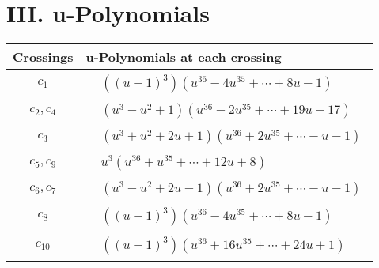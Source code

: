 \documentclass[1p]{elsarticle_modified}
\theoremstyle{definition}
\begin{document}
\newpage\renewcommand{\arraystretch}{1}
\centering \section*{ III. u-Polynomials}
\begin{tabular}{m{50pt}|m{274pt}}
Crossings & \hspace{64pt}u-Polynomials at each crossing \\
\hline $$\begin{aligned}c_{1}\end{aligned}$$&$\begin{aligned}
&((u+1)^3)(u^{36}-4 u^{35}+\cdots+8 u-1)
\end{aligned}$\\
\hline $$\begin{aligned}c_{2},c_{4}\end{aligned}$$&$\begin{aligned}
&(u^3- u^2+1)(u^{36}-2 u^{35}+\cdots+19 u-17)
\end{aligned}$\\
\hline $$\begin{aligned}c_{3}\end{aligned}$$&$\begin{aligned}
&(u^3+u^2+2 u+1)(u^{36}+2 u^{35}+\cdots- u-1)
\end{aligned}$\\
\hline $$\begin{aligned}c_{5},c_{9}\end{aligned}$$&$\begin{aligned}
&u^3(u^{36}+u^{35}+\cdots+12 u+8)
\end{aligned}$\\
\hline $$\begin{aligned}c_{6},c_{7}\end{aligned}$$&$\begin{aligned}
&(u^3- u^2+2 u-1)(u^{36}+2 u^{35}+\cdots- u-1)
\end{aligned}$\\
\hline $$\begin{aligned}c_{8}\end{aligned}$$&$\begin{aligned}
&((u-1)^3)(u^{36}-4 u^{35}+\cdots+8 u-1)
\end{aligned}$\\
\hline $$\begin{aligned}c_{10}\end{aligned}$$&$\begin{aligned}
&((u-1)^3)(u^{36}+16 u^{35}+\cdots+24 u+1)
\end{aligned}$\\
\hline
\end{tabular}\newpage\renewcommand{\arraystretch}{1}
\end{document}
